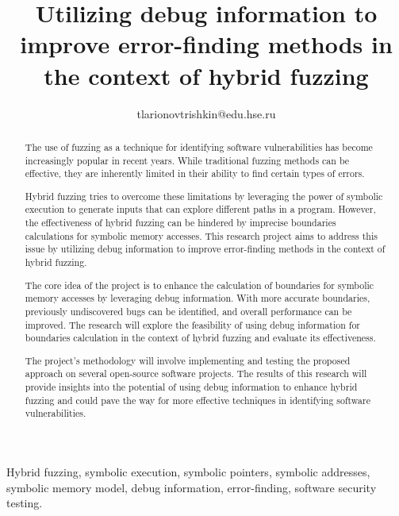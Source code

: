 \documentclass[conference]{IEEEtran}
\begin{document}
\title{Utilizing debug information to improve error-finding methods in the context of hybrid fuzzing}

\author{
    tlarionovtrishkin@edu.hse.ru
}

\maketitle

\begin{abstract}
    The use of fuzzing as a technique for identifying software vulnerabilities has become increasingly popular in recent years. While traditional fuzzing methods can be effective, they are inherently limited in their ability to find certain types of errors.

    Hybrid fuzzing tries to overcome these limitations by leveraging the power of symbolic execution to generate inputs that can explore different paths in a program. However, the effectiveness of hybrid fuzzing can be hindered by imprecise boundaries calculations for symbolic memory accesses. This research project aims to address this issue by utilizing debug information to improve error-finding methods in the context of hybrid fuzzing.

    The core idea of the project is to enhance the calculation of boundaries for symbolic memory accesses by leveraging debug information. With more accurate boundaries, previously undiscovered bugs can be identified, and overall performance can be improved. The research will explore the feasibility of using debug information for boundaries calculation in the context of hybrid fuzzing and evaluate its effectiveness.

    The project's methodology will involve implementing and testing the proposed approach on several open-source software projects. The results of this research will provide insights into the potential of using debug information to enhance hybrid fuzzing and could pave the way for more effective techniques in identifying software vulnerabilities.
\end{abstract}

\IEEEoverridecommandlockouts
\begin{IEEEkeywords}
    Hybrid fuzzing, symbolic execution, symbolic pointers, symbolic addresses, symbolic memory model, debug information, error-finding, software security testing.
\end{IEEEkeywords}
\end{document}
